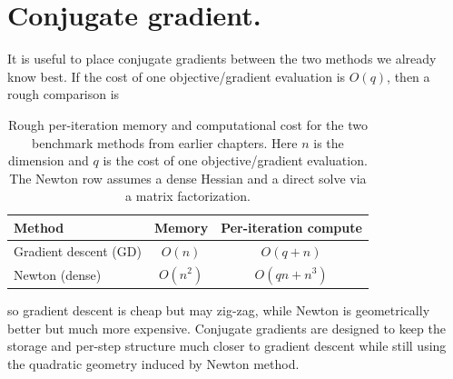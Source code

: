 \chapter{Conjugate gradient.}
\graphicspath{{chapters/05_conjugate_gradient/figures}}
\begin{abstract}
This chapter develops the method of conjugate directions, the linear
conjugate-gradient algorithm, its convergence behavior on SPD systems,
preconditioning, and the basic nonlinear conjugate-gradient family.
\end{abstract}

It is useful to place conjugate gradients between the two methods we already
know best. If the cost of one objective/gradient evaluation is $O(q)$, then a
rough comparison is
\begin{table}[ht]
  \centering
  \begin{tabular}{@{}lcc@{}}
    \toprule
    Method & Memory & Per-iteration compute\\
    \midrule
    Gradient descent (GD) & $O(n)$ & $O(q + n)$\\
    Newton (dense) & $O(n^2)$ & $O(qn+n^3)$\\
    \bottomrule
  \end{tabular}
  \caption{Rough per-iteration memory and computational cost for the two
  benchmark methods from earlier chapters. Here $n$ is the dimension and $q$
  is the cost of one objective/gradient evaluation. The Newton row assumes a
  dense Hessian and a direct solve via a matrix factorization.}
  \label{tab:ch5-gd-newton-cost}
\end{table}
so gradient descent is cheap but may zig-zag, while Newton is geometrically
better but much more expensive. Conjugate gradients are designed to keep the
storage and per-step structure much closer to gradient descent while still
using the quadratic geometry induced by Newton method.


